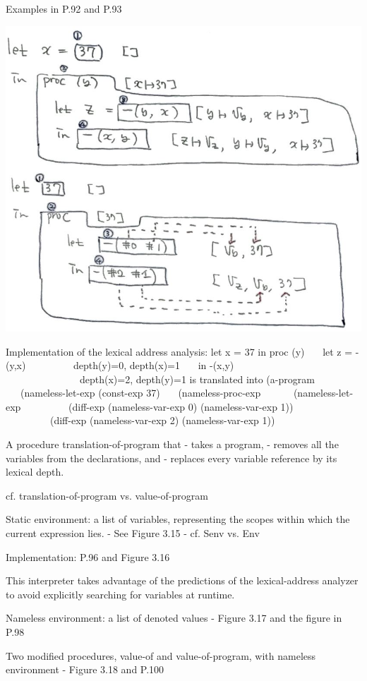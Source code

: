 \documentclass{article}
\begin{document}
\begin{huge}
Examples in P.92 and P.93


\includegraphics[width=0.75\linewidth]{fig_debruijn_indices}


Implementation of the lexical address analysis: \al
let x = 37 \al
in proc (y) \al
\ \ \ let z = -(y,x) \ \ \ \ \ \ \ \ \ depth(y)=0, depth(x)=1 \al
\ \ \ in -(x,y) \ \ \ \ \ \ \ \ \ \ \ \ \ \ \ depth(x)=2, depth(y)=1 \al
\al
is translated into \al
\al
(a-program \al
\ \ \ (nameless-let-exp (const-exp 37) \al
\ \ \ (nameless-proc-exp \al
\ \ \ \ \ \ (nameless-let-exp \al
\ \ \ \ \ \ \ \ \ (diff-exp (nameless-var-exp 0) (nameless-var-exp 1)) \al
\ \ \ \ \ \ \ \ \ (diff-exp (nameless-var-exp 2) (nameless-var-exp 1)) \al


A procedure translation-of-program that \al
- takes a program, \al
- removes all the variables from the declarations, and \al
- replaces every variable reference by its lexical depth.

cf. translation-of-program vs. value-of-program

Static environment: a list of variables, representing the scopes within
which the current expression lies. \al
- See Figure 3.15 \al
- cf. Senv vs. Env

Implementation: P.96 and Figure 3.16


This interpreter takes advantage of the predictions of the lexical-address
analyzer to avoid explicitly searching for variables at runtime.

Nameless environment: a list of denoted values \al
- Figure 3.17 and the figure in P.98

Two modified procedures, value-of and value-of-program, 
with nameless environment \al
- Figure 3.18 and P.100

\end{huge}
\end{document}
